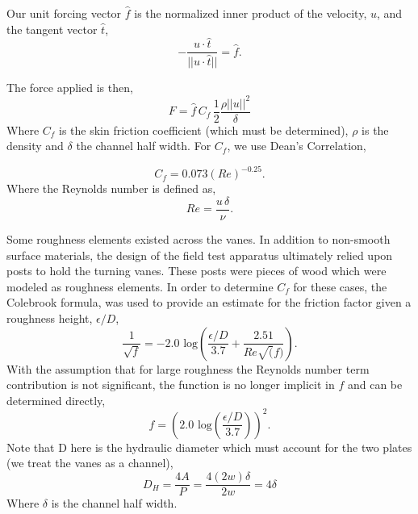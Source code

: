 Our unit forcing vector $\hat f$ is the normalized inner product of the 
velocity, $u$, and the tangent vector $\hat t$, 
\begin{equation}
- \frac{u \cdot \hat t}{|| u \cdot \hat t ||} = \hat f. 
\end{equation}

The force applied is then, 
\begin{equation}
 F = \hat f \, C_f \, \frac{1}{2} \frac{\rho || u ||^2}{\delta}
\end{equation}
Where $C_f$ is the skin friction coefficient (which must be determined),
$\rho $ is the density and $\delta$ the channel half width. 
For $C_f$, we use Dean's Correlation\cite{johnson1998handbook}, 

%
%
%
\begin{equation}
 C_f = 0.073 (Re)^{-0.25}. 
\end{equation}
Where the Reynolds number is defined as, 
\begin{equation}
 Re = \frac{u\, \delta}{\nu}.
\end{equation}

Some roughness elements existed across the vanes. In addition to
non-smooth surface materials, the design of the field test apparatus
ultimately relied upon posts to hold the turning vanes. These posts were
pieces of wood which were modeled as roughness elements. In order to
determine $C_f$ for these cases, the Colebrook formula\cite{Colebrook367},
was used to provide an estimate for the friction factor given a
roughness height, $\epsilon/D$,  
\begin{equation}
 \frac{1}{\sqrt{f}} = -2.0 \text{ log}\left(\frac{\epsilon/D}{3.7} + \frac{2.51}{Re\sqrt(f)}\right).
\end{equation}
 With the assumption that for large roughness the Reynolds number term
 contribution is not significant, the function is no longer implicit in
 $f$ and can be determined directly, 
\begin{equation}
 f = \left(2.0 \text{ log}\left(\frac{\epsilon/D}{3.7}\right)\right)^2. 
\end{equation}
Note that D here is the hydraulic diameter which must account for the
two plates (we treat the vanes as a channel),
\begin{equation}
D_H = \frac{4 A}{P} = \frac{4 (2w)\delta}{2w} = 4 \delta
\end{equation}
Where $\delta$ is the channel half width.

